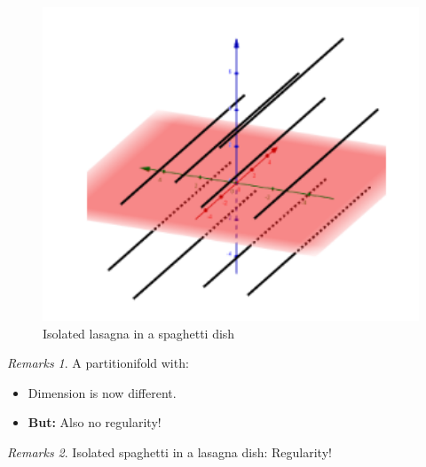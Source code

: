 \documentclass[hyperref={pdfpagelabels=false}]{beamer}
\newcommand\insertreferences{}
\theoremstyle{plain}
\theoremstyle{remark}
\newtheorem*{remark}{Remarks}
\begin{document}
{\begin{frame}
\begin{minipage}[]{0.45\textwidth}
\begin{figure}[htbp]
	\centering
		\includegraphics[width=1\textwidth]{Lonely Lasagna.png}
	\caption{Isolated lasagna in a spaghetti dish}
	\label{fig:LonelyLasagna}
\end{figure}
\end{minipage}
\hfill
\begin{minipage}[]{0.45\textwidth}
\begin{remark}
A partitionifold with:
\begin{itemize}
	\item Dimension is now different.
	\item \textbf{But:} Also no regularity!
\end{itemize}
\end{remark}
\pause
\begin{remark}
Isolated spaghetti in a lasagna dish: Regularity!
\end{remark}
\end{minipage}
\end{frame}
}

\end{document}
